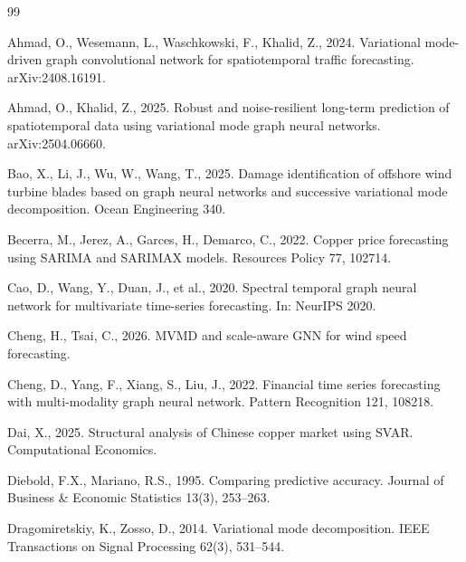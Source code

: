\documentclass[journal]{IEEEtran}
\begin{document}
\begin{thebibliography}{99}

Ahmad, O., Wesemann, L., Waschkowski, F., Khalid, Z., 2024. Variational mode-driven graph convolutional network for spatiotemporal traffic forecasting. arXiv:2408.16191.

Ahmad, O., Khalid, Z., 2025. Robust and noise-resilient long-term prediction of spatiotemporal data using variational mode graph neural networks. arXiv:2504.06660.

Bao, X., Li, J., Wu, W., Wang, T., 2025. Damage identification of offshore wind turbine blades based on graph neural networks and successive variational mode decomposition. Ocean Engineering 340.

Becerra, M., Jerez, A., Garces, H., Demarco, C., 2022. Copper price forecasting using SARIMA and SARIMAX models. Resources Policy 77, 102714.

Cao, D., Wang, Y., Duan, J., et al., 2020. Spectral temporal graph neural network for multivariate time-series forecasting. In: NeurIPS 2020.

Cheng, H., Tsai, C., 2026. MVMD and scale-aware GNN for wind speed forecasting.

Cheng, D., Yang, F., Xiang, S., Liu, J., 2022. Financial time series forecasting with multi-modality graph neural network. Pattern Recognition 121, 108218.

Dai, X., 2025. Structural analysis of Chinese copper market using SVAR. Computational Economics.

Diebold, F.X., Mariano, R.S., 1995. Comparing predictive accuracy. Journal of Business \& Economic Statistics 13(3), 253--263.

Dragomiretskiy, K., Zosso, D., 2014. Variational mode decomposition. IEEE Transactions on Signal Processing 62(3), 531--544.


\end{thebibliography}
\end{document}
